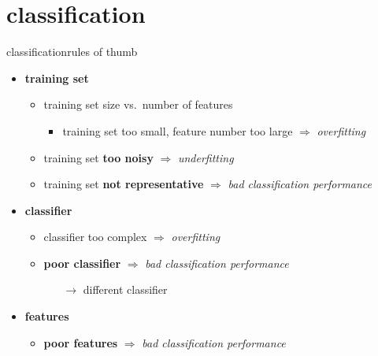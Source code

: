     \section{classification}
        \begin{frame}{classification}{rules of thumb}
            \vspace{-3mm}
            \begin{itemize}
                \item   \textbf{training set}
                    \begin{itemize}
                        \item	training set size vs.\ number of features
                            \begin{itemize}
                                \item	training set too small,%
                                feature number too large $\Rightarrow$ \textit{overfitting}
                            \end{itemize}
                        \item<1->	training set \textbf{too noisy} $\Rightarrow$ \textit{underfitting}
                        \item<1->	training set \textbf{not representative} $\Rightarrow$ \textit{bad classification performance}
                    \end{itemize}
                \smallskip
                \item<2->   \textbf{classifier}
                    \begin{itemize}
                        \item<2->   classifier too complex $\Rightarrow$ \textit{overfitting}
                        \item<2->	\textbf{poor classifier} $\Rightarrow$ \textit{bad classification performance}
                            \begin{itemize}
                                \item[$\rightarrow$]	different classifier
                            \end{itemize}
                    \end{itemize}
                \smallskip
                \item<3->   \textbf{features}
                    \begin{itemize}
                        \item<3->	\textbf{poor features} $\Rightarrow$ \textit{bad classification performance}

\end{itemize}
\end{itemize}
\end{frame}

